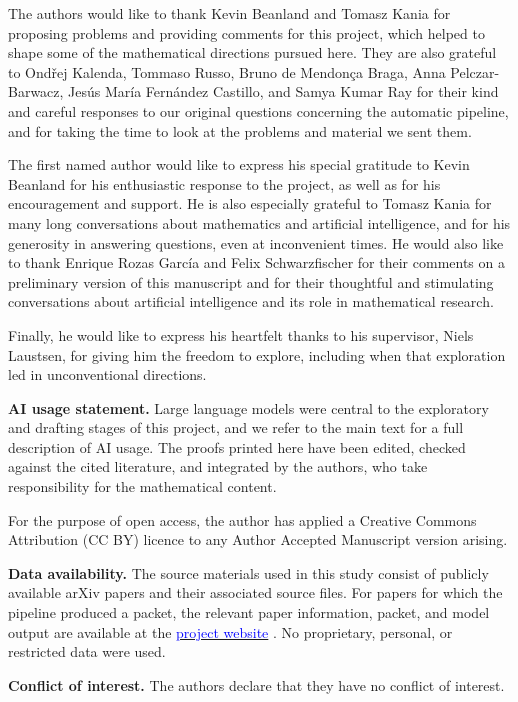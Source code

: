 \documentclass[11pt,reqno]{amsart}
\theoremstyle{plain}
\theoremstyle{definition}
\newcommand{\websiteurl}{https://mathematical-discoveries-in-the-wild.github.io/}
\newcommand{\website}[1][project website]{%
  \href{\websiteurl}{\textcolor{blue}{#1}}%
}
\begin{document}
The authors would like to thank Kevin Beanland and Tomasz Kania for proposing problems and providing comments for this project, which helped to shape some of the mathematical directions pursued here. They are also grateful to Ond\v{r}ej Kalenda, Tommaso Russo, Bruno de Mendon\c{c}a Braga, Anna Pelczar-Barwacz, Jes\'us Mar\'ia Fern\'andez Castillo, and Samya Kumar Ray for their kind and careful responses to our original questions concerning the automatic pipeline, and for taking the time to look at the problems and material we sent them.

The first named author would like to express his special gratitude to Kevin Beanland for his enthusiastic response to the project, as well as for his encouragement and support. He is also especially grateful to Tomasz Kania for many long conversations about mathematics and artificial intelligence, and for his generosity in answering questions, even at inconvenient times. He would also like to thank Enrique Rozas García and Felix Schwarzfischer for their comments on a preliminary version of this manuscript and for their thoughtful and stimulating conversations about artificial intelligence and its role in mathematical research.

Finally, he would like to express his heartfelt thanks to his supervisor, Niels Laustsen, for giving him the freedom to explore, including when that exploration led in unconventional directions. \medskip

\noindent\textbf{AI usage statement.} Large language models were central to the exploratory and drafting stages of this project, and we refer to the main text for a full description of AI usage. The proofs printed here have been edited, checked against the cited literature, and integrated by the authors, who take responsibility for the mathematical content. \medskip

For the purpose of open access, the author has applied a Creative Commons Attribution (CC BY) licence to any Author Accepted Manuscript version arising. \medskip

\noindent\textbf{Data availability.} The source materials used in this study consist of publicly available arXiv papers and their associated source files. For papers for which the pipeline produced a  packet, the relevant paper information, packet, and model output are available at the \website[project website]. No proprietary, personal, or restricted data were used.

\noindent\textbf{Conflict of interest.} The authors declare that they have no conflict of interest.
\end{document}
